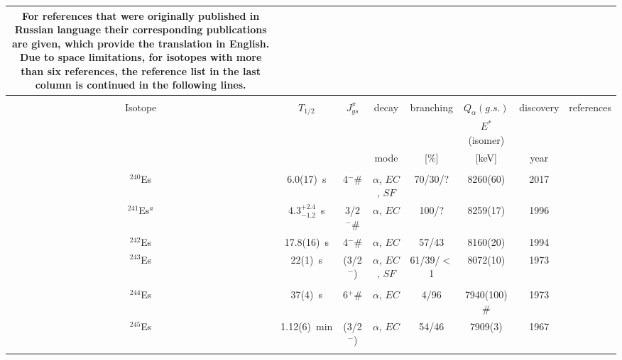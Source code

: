 \begin{center}
\begin{longtable}{c|ccccccl}
{For references that were originally published in Russian language their corresponding publications are given, which provide the translation in English.
Due to space limitations, for isotopes with more than six references, the reference list in the last column is continued in the following lines.
\label{tab:isotope_list}}\\
\hline\\
Isotope 		& $T_{1/2} $		&  $J_{gs}^\pi$	&	decay    			&branching	& $Q_\alpha (g.s.)$ 	&discovery& references 	\\
			&				&		 	&					&			& $E^*$ (isomer)	&		&			\\
			&				&		 	&	mode			& [\%]		& [keV]			    &year	&			\\
\hline\\
$^{240}$Es	& 6.0(17)~s		&4$^-\#$	&$\alpha$, $EC$, $SF$&70/30/?		& 8260(60)		&2017	&{\tiny\cite{Konki2017,Khuyagbaatar2020,Pore2020}}\\
$^{241}$Es$^a$& 4.3$^{+2.4}_{-1.2}$~s&3/2$^-\#$&$\alpha$, $EC$&100/?		& 8259(17)		&1996	&{\tiny\cite{Hofmann1994a,Ninov1996,Khuyagbaatar2020,Hessberger2021}}\\
$^{242}$Es	& 17.8(16)~s		&4$^-\#$&$\alpha$, $EC$	    &57/43	    	& 8160(20)		&1994	&{\tiny\cite{Lazarev1994,Hofmann1994a,Ninov1996,Shaughnessy2000,Antalic2010,Khuyagbaatar2024}}\\
$^{243}$Es	& 22(1)~s		& (3/2$^-$)	&$\alpha$, $EC$, $SF$	&61/39/$<$1	& 8072(10)		&1973	&{\tiny\cite{Eskola1973a,Hatsukawa1989,Lazarev1994,Hessberger2005,Antalic2010,Briselet2019}}\\
			& 				&  			&					&			    & 				&		&{\tiny\cite{Khuyagbaatar2020,Hessberger2022}}\\
$^{244}$Es	& 37(4)~s	 	&6$^+\#$ 	&$\alpha$, $EC$		&4/96		    & 7940(100)$\#$	&1973	&{\tiny\cite{Eskola1973a,Gangrsky1980,Hessberger2001,Shaughnessy2002,Khuyagbaatar2008}}\\
$^{245}$Es	& 1.12(6)~min	&  (3/2$^-$)&$\alpha$, $EC$		&54/46		    & 7909(3)		&1967	&{\tiny\cite{Mikheev1967,Eskola1973,Hatsukawa1989,Hessberger2005,Gates2008,Hessberger2009}}\\
			& 				&  			&					&			    & 				&		&{\tiny\cite{Ito2018,Briselet2019}}\\

\end{longtable}
\end{center}

